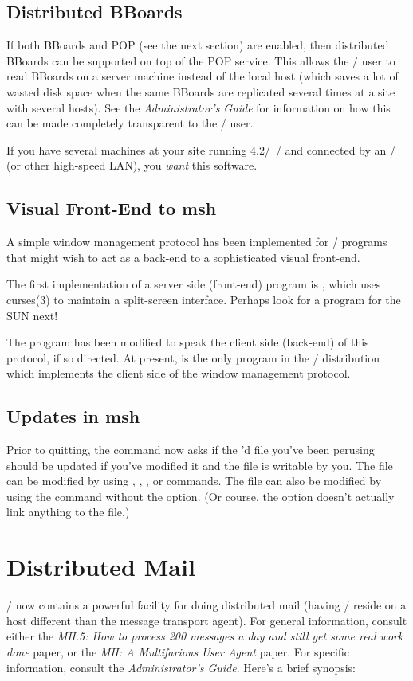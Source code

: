 \subsection*	{Distributed BBoards}
If both BBoards and POP (see the next section) are enabled,
then distributed BBoards can be supported on top of the POP service.
This allows the \MH/ user to read BBoards on a server machine
instead of the local host
(which saves a lot of wasted disk space when the same BBoards are replicated
several times at a site with several hosts).
See the {\em Administrator's Guide\/} for information on how this can be made
completely transparent to the \MH/ user.

If you have several machines at your site running 4.2\bsd/~\unix/
and connected by an \ethernet/ (or other high-speed LAN),
you {\em want\/} this software.

\subsection*	{Visual Front-End to msh}
A simple window management protocol has been implemented for \MH/ programs
that might wish to act as a back-end to a sophisticated visual front-end.

The first implementation of a server side (front-end) program is ,
which uses \man curses(3) to maintain a split-screen interface.
Perhaps look for a  program for the SUN next!

The  program has been modified to speak the client side (back-end)
of this protocol, if so directed.
At present,  is the only program in the \MH/ distribution which
implements the client side of the window management protocol.

\subsection*	{Updates in msh}
Prior to quitting,
the  command now asks if the 'd file you've been
perusing should be updated if you've modified it and the file is writable by
you.
The file can be modified by using , , ,
or  commands.
The file can also be modified by using the  command without the
 option.
(Or course,
the  option doesn't actually link anything to the file.)

\section*	{Distributed Mail}
\MH/ now contains a powerful facility for doing distributed mail
(having \MH/ reside on a host different than the message transport agent).
For general information,
consult either the 
{\em MH.5: How to process 200 messages a day and still get some real work
done} paper,
or the {\em MH: A Multifarious User Agent} paper.
For specific information,
consult the {\em Administrator's Guide}.
Here's a brief synopsis:

